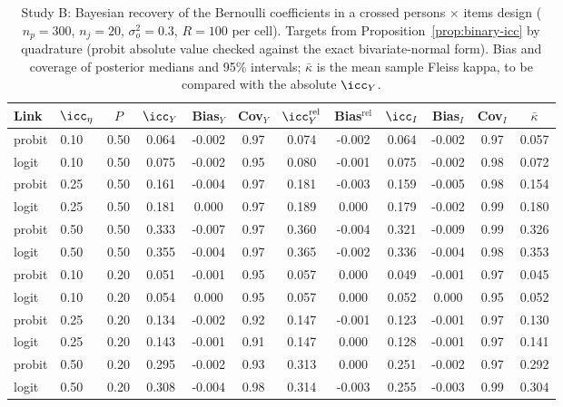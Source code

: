 \begin{table}[H]
\centering
\caption{Study B: Bayesian recovery of the Bernoulli coefficients in a crossed persons $\times$ items design ($n_p = 300$, $n_j = 20$, $\sigma^2_o = 0.3$, $R = 100$ per cell). Targets from Proposition~\ref{prop:binary-icc} by quadrature (probit absolute value checked against the exact bivariate-normal form). Bias and coverage of posterior medians and 95\% intervals; $\bar\kappa$ is the mean sample Fleiss kappa, to be compared with the absolute $\icc_Y$.}
\label{tab:sim-B}
\small
\begin{tabular}{llcccccccccc}
\toprule
Link & $\icc_\eta$ & $P$ & $\icc_Y$ & Bias$_Y$ & Cov$_Y$ & $\icc_Y^{\mathrm{rel}}$ & Bias$^{\mathrm{rel}}$ & $\icc_I$ & Bias$_I$ & Cov$_I$ & $\bar\kappa$ \\
\midrule
probit & 0.10 & 0.50 & 0.064 & -0.002 & 0.97 & 0.074 & -0.002 & 0.064 & -0.002 & 0.97 & 0.057 \\
logit & 0.10 & 0.50 & 0.075 & -0.002 & 0.95 & 0.080 & -0.001 & 0.075 & -0.002 & 0.98 & 0.072 \\
probit & 0.25 & 0.50 & 0.161 & -0.004 & 0.97 & 0.181 & -0.003 & 0.159 & -0.005 & 0.98 & 0.154 \\
logit & 0.25 & 0.50 & 0.181 & 0.000 & 0.97 & 0.189 & 0.000 & 0.179 & -0.002 & 0.99 & 0.180 \\
probit & 0.50 & 0.50 & 0.333 & -0.007 & 0.97 & 0.360 & -0.004 & 0.321 & -0.009 & 0.99 & 0.326 \\
logit & 0.50 & 0.50 & 0.355 & -0.004 & 0.97 & 0.365 & -0.002 & 0.336 & -0.004 & 0.98 & 0.353 \\
probit & 0.10 & 0.20 & 0.051 & -0.001 & 0.95 & 0.057 & 0.000 & 0.049 & -0.001 & 0.97 & 0.045 \\
logit & 0.10 & 0.20 & 0.054 & 0.000 & 0.95 & 0.057 & 0.000 & 0.052 & 0.000 & 0.95 & 0.052 \\
probit & 0.25 & 0.20 & 0.134 & -0.002 & 0.92 & 0.147 & -0.001 & 0.123 & -0.001 & 0.97 & 0.130 \\
logit & 0.25 & 0.20 & 0.143 & -0.001 & 0.91 & 0.147 & 0.000 & 0.128 & -0.001 & 0.97 & 0.141 \\
probit & 0.50 & 0.20 & 0.295 & -0.002 & 0.93 & 0.313 & 0.000 & 0.251 & -0.002 & 0.97 & 0.292 \\
logit & 0.50 & 0.20 & 0.308 & -0.004 & 0.98 & 0.314 & -0.003 & 0.255 & -0.003 & 0.99 & 0.304 \\
\bottomrule
\end{tabular}
\end{table}
